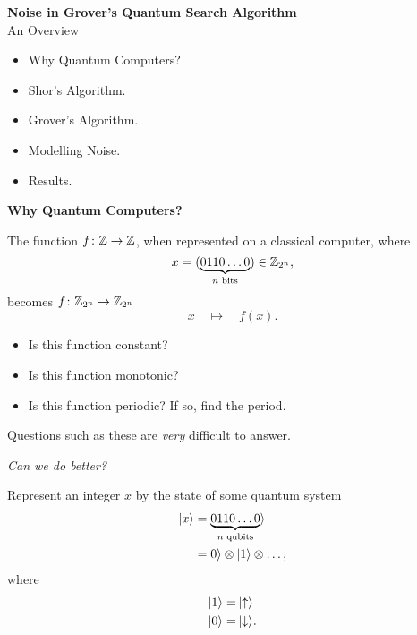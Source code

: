 \documentclass{slides}
\begin{document}
\begin{center}
\textbf{Noise in Grover's Quantum Search Algorithm}\\
\bigskip
\bigskip
{An Overview}
\end{center}

\begin{itemize}
\item Why Quantum Computers?
\item Shor's Algorithm.
\item Grover's Algorithm.
\item Modelling Noise.
\item Results.
\end{itemize}

\pagebreak


\begin{center}
\textbf{Why Quantum Computers?}
\end{center}

The function $f\colon{\mathbb{Z}}\to{\mathbb{Z}}$,
when represented on a classical computer, where
\begin{equation*}
x=(\underbrace{0110\ldots0}_{n\text{ bits}}) \in{\mathbb{Z}}_{2^n},
\end{equation*}
becomes $f\colon{\mathbb{Z}}_{2^n}\to{\mathbb{Z}}_{2^n}$
\begin{equation*}
x\quad\mapsto\quad f(x).
\end{equation*}
\begin{itemize}
\item Is this function constant?
\item Is this function monotonic?
\item Is this function periodic?  If so, find the period.
\end{itemize}
Questions such as these are \emph{very} difficult to answer.

\begin{center}
{\sl Can we do better?}
\end{center}

\pagebreak

Represent an integer $x$ by the state of some quantum system
\begin{equation*}
\begin{split}
{|{x}\rangle}=&{|{\underbrace{0110\ldots0}_{n\text{ qubits}}}\rangle}\\
 =& {|{0}\rangle}\otimes
             {|{1}\rangle}\otimes\ldots,
\end{split}
\end{equation*}
where
\begin{equation*}
\begin{split}
    {|{1}\rangle} =& \,{|{\uparrow}\rangle}\\
    {|{0}\rangle} =& \,{|{\downarrow}\rangle}.
\end{split}
\end{equation*}
\end{document}
